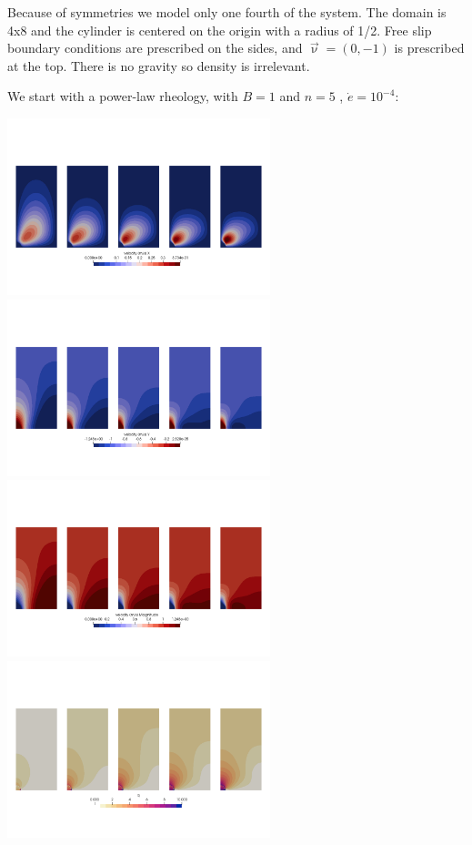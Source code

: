 Because of symmetries we model only one fourth of the system.
The domain is 4x8 and the cylinder is centered on the origin with a radius of 1/2.
Free slip boundary conditions are prescribed on the sides, and $\vec\upnu=(0,-1)$
is prescribed at the top. There is no gravity so density is irrelevant. 

We start with a power-law rheology, with $B=1$ and $n=5$ , $\dot{e}=10^{-4}$:
\begin{center}
\includegraphics[width=7.64cm]{python_codes/fieldstone_87/results/experiment_11/meth3/u}
\includegraphics[width=7.64cm]{python_codes/fieldstone_87/results/experiment_11/meth3/v}\\
\includegraphics[width=7.64cm]{python_codes/fieldstone_87/results/experiment_11/meth3/vel}
\includegraphics[width=7.64cm]{python_codes/fieldstone_87/results/experiment_11/meth3/press}\\

\end{center}
